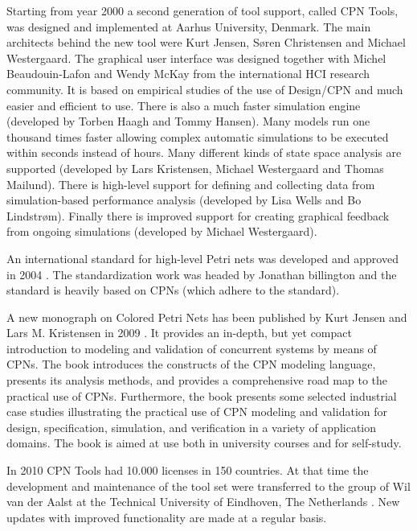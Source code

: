 Starting from year 2000 a second generation of tool support, called
CPN Tools, was designed and implemented at Aarhus University,
Denmark. The main architects behind the new tool were Kurt Jensen,
Søren Christensen and Michael Westergaard. The graphical user
interface was designed together with Michel Beaudouin-Lafon and Wendy
McKay from the international HCI research community. It is based on
empirical studies of the use of Design/CPN and much easier and
efficient to use. There is also a much faster simulation engine
(developed by Torben Haagh and Tommy Hansen). Many models run one
thousand times faster allowing complex automatic simulations to be
executed within seconds instead of hours. Many different kinds of
state space analysis are supported (developed by Lars Kristensen,
Michael Westergaard and Thomas Mailund). There is high-level support
for defining and collecting data from simulation-based performance
analysis (developed by Lisa Wells and Bo Lindstrøm). Finally there is
improved support for creating graphical feedback from ongoing
simulations (developed by Michael Westergaard).

An international standard for high-level Petri nets was developed and
approved in 2004 \cite{hcpnstandard}. The standardization work was
headed by Jonathan billington and the standard is heavily based on
CPNs (which adhere to the standard).

A new monograph on Colored Petri Nets has been published by Kurt
Jensen and Lars M. Kristensen in 2009 \cite{newcpnbook}. It provides
an in-depth, but yet compact introduction to modeling and validation
of concurrent systems by means of CPNs. The book introduces the
constructs of the CPN modeling language, presents its analysis
methods, and provides a comprehensive road map to the practical use of
CPNs. Furthermore, the book presents some selected industrial case
studies illustrating the practical use of CPN modeling and validation
for design, specification, simulation, and verification in a variety
of application domains. The book is aimed at use both in university
courses and for self-study.

In 2010 CPN Tools had 10.000 licenses in 150 countries. At that time
the development and maintenance of the tool set were transferred to
the group of Wil van der Aalst at the Technical University of
Eindhoven, The Netherlands \cite{cpntoolsweb}. New updates with
improved functionality are made at a regular basis.
